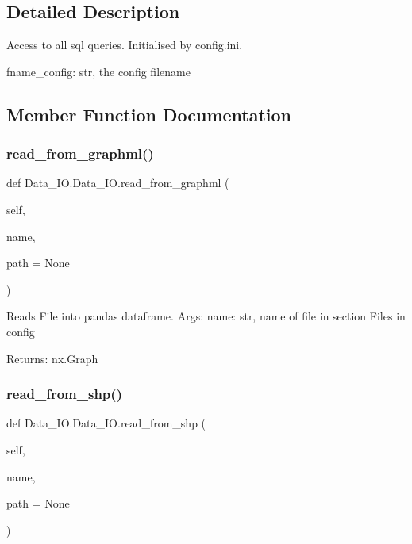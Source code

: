 \subsection{Detailed Description}
\begin{DoxyVerb}Access to all sql queries. Initialised by config.ini.

fname_config: str, the config filename
\end{DoxyVerb}
 

\subsection{Member Function Documentation}
\mbox{\label{class_data___i_o_1_1_data___i_o_aacbcba44953eedd8f504a6e6dff96f40}} 
\subsubsection{\texorpdfstring{read\+\_\+from\+\_\+graphml()}{read\_from\_graphml()}}
{\footnotesize\ttfamily def Data\+\_\+\+I\+O.\+Data\+\_\+\+I\+O.\+read\+\_\+from\+\_\+graphml (\begin{DoxyParamCaption}\item[{}]{self,  }\item[{}]{name,  }\item[{}]{path = {\ttfamily None} }\end{DoxyParamCaption})}

\begin{DoxyVerb}Reads File into pandas dataframe.
Args:
    name: str, name of file in section Files in config

Returns:
    nx.Graph
\end{DoxyVerb}
 \mbox{\label{class_data___i_o_1_1_data___i_o_a14727729f303e0164a384debe39c3fea}} 
\subsubsection{\texorpdfstring{read\+\_\+from\+\_\+shp()}{read\_from\_shp()}}
{\footnotesize\ttfamily def Data\+\_\+\+I\+O.\+Data\+\_\+\+I\+O.\+read\+\_\+from\+\_\+shp (\begin{DoxyParamCaption}\item[{}]{self,  }\item[{}]{name,  }\item[{}]{path = {\ttfamily None} }\end{DoxyParamCaption})}

